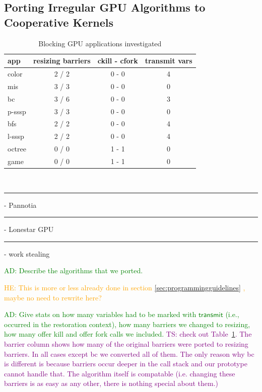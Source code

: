 \documentclass[numbers,nocopyrightspace,10pt]{sigplanconf}
\newcommand\crule[3][black]{\textcolor{#1}{\rule{#2}{#3}}}
\newcommand{\ADComment}[1]{\textcolor{green}{AD: #1}}
\newcommand{\HEComment}[1]{\textcolor{orange}{HE: #1}}
\newcommand{\TSComment}[1]{\textcolor{purple}{TS: #1}}
\newcommand{\transmit}{\mathsf{transmit}}
\begin{document}
\subsection{Porting Irregular GPU Algorithms to Cooperative Kernels}\label{sec:portingalgorithms}

\begin{table}
\small
\centering
\begin{tabular}{ l c c c }
app & resizing barriers & ckill - cfork & transmit vars\\
\hline
\rowcolor{Gray1}
color & 2 / 2 & 0 - 0 & 4\\
\rowcolor{Gray1}
mis & 3 / 3 & 0 - 0 & 0\\
\rowcolor{Gray1}
bc & 3 / 6 & 0 - 0 & 3\\
\rowcolor{Gray1}
p-sssp & 3 / 3 & 0 - 0 & 0 \\
\rowcolor{Gray2}
bfs & 2 / 2 & 0 - 0  & 4 \\
\rowcolor{Gray2}
l-sssp & 2 / 2 & 0 - 0  & 4 \\
\rowcolor{Gray3}
octree & 0 / 0 & 1 - 1 & 0\\
\rowcolor{Gray3}
game & 0 / 0 & 1 - 1 & 0\\
\end{tabular} \\
\vspace{.2cm}
\crule[Gray1]{.2cm}{.2cm} - Pannotia \hspace{.4cm} \crule[Gray2]{.2cm}{.2cm} - Lonestar GPU  \hspace{.4cm}  \crule[Gray3]{.2cm}{.2cm} - work stealing
\caption{Blocking GPU applications investigated}
\label{tab:applications}
\end{table}

\ADComment{Describe the algorithms that we ported.}

\HEComment{This is more or less already done in section
\ref{sec:programmingguidelines} , maybe no need to rewrite here?}

\ADComment{Give stats on how many variables had to be marked with
  $\transmit$ (i.e., occurred in the restoration context), how many
  barriers we changed to resizing, how many offer kill and offer fork
  calls we included.}  \TSComment{check out
  Table~\ref{tab:applications}. The barrier column shows how many of
  the original barriers were ported to resizing barriers. In all cases
  except bc we converted all of them. The only reason why bc is
  different is because barriers occur deeper in the call stack and our
  prototype cannot handle that. The algorithm itself is compatable
  (i.e. changing these barriers is as easy as any other, there is
  nothing special about them.)}
\end{document}
